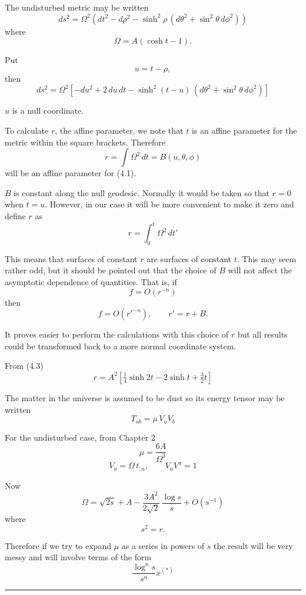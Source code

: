 
The undisturbed metric may be written
\[
ds^{2} = \Omega^{2} \left( dt^{2} - d\rho^{2} - \sinh^{2} \rho \, ( d\theta^{2} + \sin^{2}\theta \, d\phi^{2} ) \right)
\]
where
\[
\Omega = A(\cosh t - 1).
\]

Put
\[
u = t - \rho,
\]
then
\[
ds^{2} = \Omega^{2} \left[ -du^{2} + 2 \, du \, dt - \sinh^{2}(t-u)\,(d\theta^{2} + \sin^{2}\theta \, d\phi^{2}) \right]
\tag{4.1}
\]

$u$ is a null coordinate.  

To calculate $r$, the affine parameter, we note that $t$ is an affine parameter for the metric within the square brackets.  
Therefore
\[
r = \int \Omega^{2} \, dt = B(u,\theta,\phi)
\tag{4.2}
\]
will be an affine parameter for (4.1).  

$B$ is constant along the null geodesic. Normally it would be taken so that $r=0$ when $t=u$.  
However, in our case it will be more convenient to make it zero and define $r$ as
\[
r = \int_{0}^{t} \Omega^{2} \, dt'
\tag{4.3}
\]

This means that surfaces of constant $r$ are surfaces of constant $t$.  
This may seem rather odd, but it should be pointed out that the choice of $B$ will not affect the asymptotic dependence of quantities.  
That is, if
\[
f = O(r^{-n})
\]
then
\[
f = O(r'^{-n}), \qquad r' = r + B.
\]


It proves easier to perform the calculations with this choice of $r$  
but all results could be transformed back to a more normal coordinate system.  

From (4.3)
\[
r = A^{2} \left[ \tfrac{1}{4} \sinh 2t - 2 \sinh t + \tfrac{3}{2} t \right]
\tag{4.4}
\]

The matter in the universe is assumed to be dust so its energy tensor may be written
\[
T_{ab} = \mu \, V_{a} V_{b}
\tag{4.5}
\]

For the undisturbed case, from Chapter 2
\[
\mu = \frac{6A}{\Omega^{3}}
\tag{4.6}
\]
\[
V_{a} = \Omega \, t_{;a}, 
\qquad 
V_{a} V^{a} = 1
\]

Now
\[
\Omega = \sqrt{2s} + A - \frac{3A^{2}}{2\sqrt{2}} \, \frac{\log s}{s} + O(s^{-1})
\tag{4.7}
\]
where
\[
s^{2} = r.
\]

Therefore if we try to expand $\mu$ as a series in powers of $s$  
the result will be very messy and will involve terms of the form
\[
\frac{\log^{n} s}{s^{n}} x^{(*)} 
\]

\bigskip
\noindent\rule{\linewidth}{0.4pt}  

